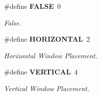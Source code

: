 \begin{CompactItemize}
\#define {\bf FALSE}~0
\begin{CompactList}\small\item\em False. \item\end{CompactList}\item 
\#define {\bf HORIZONTAL}~2
\begin{CompactList}\small\item\em Horizontal Window Placement. \item\end{CompactList}\item 
\#define {\bf VERTICAL}~4
\begin{CompactList}\small\item\em Vertical Window Placement. \item\end{CompactList}\end{CompactItemize}
